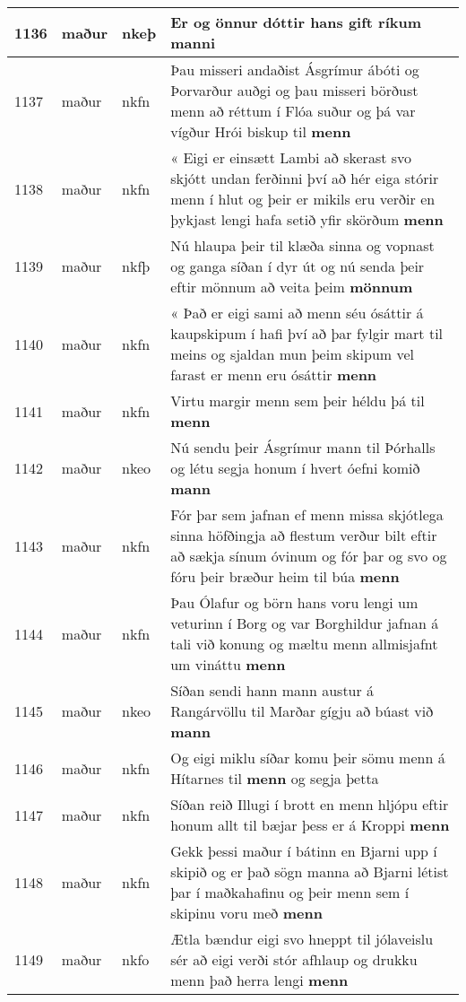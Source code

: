 \documentclass{article}
\begin{document}
\begin{longtable}{p{1cm}|p{1cm}|p{1cm}|p{13cm}}
\hline
1136&maður&nkeþ&Er og önnur dóttir hans gift ríkum \textbf{manni} \\
\hline
1137&maður&nkfn&Þau misseri andaðist Ásgrímur ábóti og Þorvarður auðgi og þau misseri börðust menn að réttum í Flóa suður og þá var vígður Hrói biskup til \textbf{menn} \\
\hline
1138&maður&nkfn&« Eigi er einsætt Lambi að skerast svo skjótt undan ferðinni því að hér eiga stórir menn í hlut og þeir er mikils eru verðir en þykjast lengi hafa setið yfir skörðum \textbf{menn} \\
\hline
1139&maður&nkfþ&Nú hlaupa þeir til klæða sinna og vopnast og ganga síðan í dyr út og nú senda þeir eftir mönnum að veita þeim \textbf{mönnum} \\
\hline
1140&maður&nkfn&« Það er eigi sami að menn séu ósáttir á kaupskipum í hafi því að þar fylgir mart til meins og sjaldan mun þeim skipum vel farast er menn eru ósáttir \textbf{menn} \\
\hline
1141&maður&nkfn&Virtu margir menn sem þeir héldu þá til \textbf{menn} \\
\hline
1142&maður&nkeo&Nú sendu þeir Ásgrímur mann til Þórhalls og létu segja honum í hvert óefni komið \textbf{mann} \\
\hline
1143&maður&nkfn&Fór þar sem jafnan ef menn missa skjótlega sinna höfðingja að flestum verður bilt eftir að sækja sínum óvinum og fór þar og svo og fóru þeir bræður heim til búa \textbf{menn} \\
\hline
1144&maður&nkfn&Þau Ólafur og börn hans voru lengi um veturinn í Borg og var Borghildur jafnan á tali við konung og mæltu menn allmisjafnt um vináttu \textbf{menn} \\
\hline
1145&maður&nkeo&Síðan sendi hann mann austur á Rangárvöllu til Marðar gígju að búast við \textbf{mann} \\
\hline
1146&maður&nkfn&Og eigi miklu síðar komu þeir sömu menn á Hítarnes til \textbf{menn} og segja þetta\\
\hline
1147&maður&nkfn&Síðan reið Illugi í brott en menn hljópu eftir honum allt til bæjar þess er á Kroppi \textbf{menn} \\
\hline
1148&maður&nkfn&Gekk þessi maður í bátinn en Bjarni upp í skipið og er það sögn manna að Bjarni létist þar í maðkahafinu og þeir menn sem í skipinu voru með \textbf{menn} \\
\hline
1149&maður&nkfo&Ætla bændur eigi svo hneppt til jólaveislu sér að eigi verði stór afhlaup og drukku menn það herra lengi \textbf{menn} \\

\end{longtable}
\end{document}
